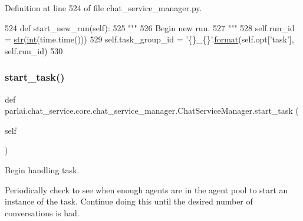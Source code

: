 Definition at line 524 of file chat\+\_\+service\+\_\+manager.\+py.


\begin{DoxyCode}
524     \textcolor{keyword}{def }start\_new\_run(self):
525         \textcolor{stringliteral}{"""}
526 \textcolor{stringliteral}{        Begin new run.}
527 \textcolor{stringliteral}{        """}
528         self.run\_id = \hyperlink{namespacegenerate__task__READMEs_a5b88452ffb87b78c8c85ececebafc09f}{str}(\hyperlink{namespacelanguage__model_1_1eval__ppl_a7d12ee00479673c5c8d1f6d01faa272a}{int}(time.time()))
529         self.task\_group\_id = \textcolor{stringliteral}{'\{\}\_\{\}'}.\hyperlink{namespaceparlai_1_1chat__service_1_1services_1_1messenger_1_1shared__utils_a32e2e2022b824fbaf80c747160b52a76}{format}(self.opt[\textcolor{stringliteral}{'task'}], self.run\_id)
530 
\end{DoxyCode}
\mbox{\label{classparlai_1_1chat__service_1_1core_1_1chat__service__manager_1_1ChatServiceManager_a207c63f2a66acae0dc8b04c528036e8b}} 
\subsubsection{\texorpdfstring{start\+\_\+task()}{start\_task()}}
{\footnotesize\ttfamily def parlai.\+chat\+\_\+service.\+core.\+chat\+\_\+service\+\_\+manager.\+Chat\+Service\+Manager.\+start\+\_\+task (\begin{DoxyParamCaption}\item[{}]{self }\end{DoxyParamCaption})}

\begin{DoxyVerb}Begin handling task.

Periodically check to see when enough agents are in the agent pool to start an
instance of the task. Continue doing this until the desired number of
conversations is had.
\end{DoxyVerb}
 


